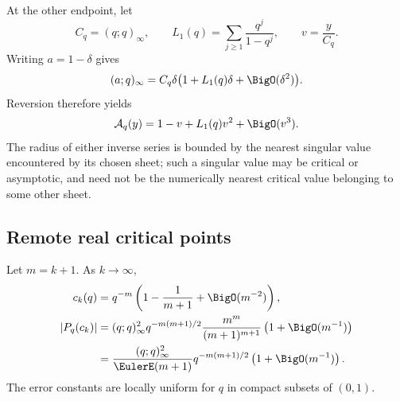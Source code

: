 At the other endpoint, let
\[
 C_q=(q;q)_\infty,\qquad
 L_1(q)=\sum_{j\geq1}\frac{q^j}{1-q^j},\qquad v=\frac y{C_q}.
\]
Writing \(a=1-\delta\) gives
\[
 (a;q)_\infty=C_q\delta\bigl(1+L_1(q)\delta+\BigO(\delta^2)\bigr).
\]
Reversion therefore yields
\begin{equation}
 \mathcal A_q(y)=1-v+L_1(q)v^2+\BigO(v^3).
 \label{eq:ip-zero-target-jet}
\end{equation}
The radius of either inverse series is bounded by the nearest singular value
encountered by its chosen sheet; such a singular value may be critical or
asymptotic, and need not be the numerically nearest critical value belonging
to some other sheet.

\subsection{Remote real critical points}

\begin{theorem}
\label{thm:ip-remote-gaps}
Let \(m=k+1\).  As \(k\to\infty\),
\begin{align}
 c_k(q)&=q^{-m}\left(1-\frac1{m+1}+\BigO(m^{-2})\right),
 \label{eq:ip-remote-location}\\
 |P_q(c_k)|
 &= (q;q)_\infty^2q^{-m(m+1)/2}
 \frac{m^m}{(m+1)^{m+1}}\left(1+\BigO(m^{-1})\right)
 \label{eq:ip-remote-value}\\
 &=\frac{(q;q)_\infty^2}{\EulerE(m+1)}
 q^{-m(m+1)/2}\left(1+\BigO(m^{-1})\right).
 \notag
\end{align}
The error constants are locally uniform for \(q\) in compact subsets of
\((0,1)\).
\end{theorem}

